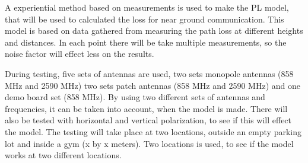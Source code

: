 A experiential method based on measurements is used to make the PL model, that will be used to calculated the loss for near ground communication. This model is based on data gathered from measuring the path loss at different heights and distances. In each point there will be take multiple measurements, so the noise factor will effect less on the results.

During testing, five sets of antennas are used, two sets monopole antennas (858 MHz and 2590 MHz) two sets patch antennas (858 MHz and 2590 MHz) and one demo board set (858 MHz). By using two different sets of antennas and frequencies,  it can be taken into account, when the model is made. There will also be tested with horizontal and vertical polarization, to see if this will effect the model. The testing will take place at two locations, outside an empty parking lot and inside a gym (x by x meters). Two locations is used, to see if the model works at two different locations.
